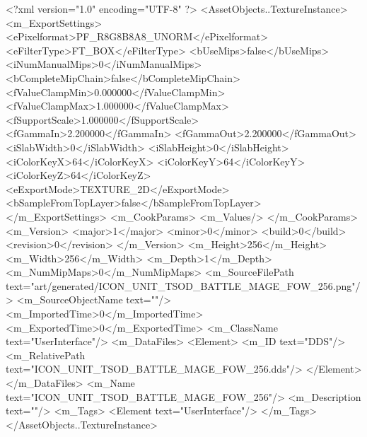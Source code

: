 <?xml version="1.0" encoding="UTF-8" ?>
<AssetObjects..TextureInstance>
	<m_ExportSettings>
		<ePixelformat>PF_R8G8B8A8_UNORM</ePixelformat>
		<eFilterType>FT_BOX</eFilterType>
		<bUseMips>false</bUseMips>
		<iNumManualMips>0</iNumManualMips>
		<bCompleteMipChain>false</bCompleteMipChain>
		<fValueClampMin>0.000000</fValueClampMin>
		<fValueClampMax>1.000000</fValueClampMax>
		<fSupportScale>1.000000</fSupportScale>
		<fGammaIn>2.200000</fGammaIn>
		<fGammaOut>2.200000</fGammaOut>
		<iSlabWidth>0</iSlabWidth>
		<iSlabHeight>0</iSlabHeight>
		<iColorKeyX>64</iColorKeyX>
		<iColorKeyY>64</iColorKeyY>
		<iColorKeyZ>64</iColorKeyZ>
		<eExportMode>TEXTURE_2D</eExportMode>
		<bSampleFromTopLayer>false</bSampleFromTopLayer>
	</m_ExportSettings>
	<m_CookParams>
		<m_Values/>
	</m_CookParams>
	<m_Version>
		<major>1</major>
		<minor>0</minor>
		<build>0</build>
		<revision>0</revision>
	</m_Version>
	<m_Height>256</m_Height>
	<m_Width>256</m_Width>
	<m_Depth>1</m_Depth>
	<m_NumMipMaps>0</m_NumMipMaps>
	<m_SourceFilePath text="art/generated/ICON_UNIT_TSOD_BATTLE_MAGE_FOW_256.png"/>
	<m_SourceObjectName text=""/>
	<m_ImportedTime>0</m_ImportedTime>
	<m_ExportedTime>0</m_ExportedTime>
	<m_ClassName text="UserInterface"/>
	<m_DataFiles>
		<Element>
			<m_ID text="DDS"/>
			<m_RelativePath text="ICON_UNIT_TSOD_BATTLE_MAGE_FOW_256.dds"/>
		</Element>
	</m_DataFiles>
	<m_Name text="ICON_UNIT_TSOD_BATTLE_MAGE_FOW_256"/>
	<m_Description text=""/>
	<m_Tags>
		<Element text="UserInterface"/>
	</m_Tags>
</AssetObjects..TextureInstance>
